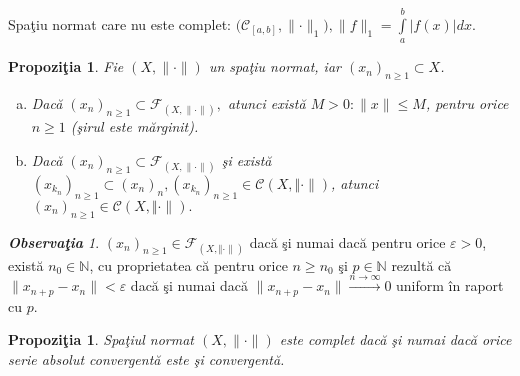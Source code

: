 \documentclass[ a4paper, 12pt]{report}
\newtheorem{prop}[theorem]{\bf Propozi\c tia }
\theoremstyle{definition}
\theoremstyle{remark}
\newtheorem{obs}{\bf Observa\c tia }[section]
\numberwithin{equation}{section}
\begin{document}
Spa\c tiu normat care nu este complet:
$\Big(\mathcal{C}_{[a,b]}, \lVert \cdot \rVert_{1} \Big), \lVert f \rVert_{1} = \int\limits_{a}^{b}\lvert f(x) \rvert dx$.
\begin{prop}\label{apa}
Fie $(X, \lVert \cdot \rVert)$ un spa\c tiu normat, iar $(x_n)_{n \geq 1} \subset X$.
\begin{enumerate}[(a)]
\item Dac\u a $(x_n)_{n \geq 1} \subset \mathcal{F}_{(X, \lVert \cdot \rVert)},$ atunci  exist\u a $M>0 : \lVert x \rVert \leq M$, pentru orice $n \geq 1$ (\c sirul este m\u arginit).
\item Dac\u a  $(x_n)_{n \geq 1} \subset \mathcal{F}_{(X, \lVert \cdot \rVert)}$ \c si  exist\u a $(x_{k_n})_{n \geq 1} \subset (x_n)_n,(x_{k_n})_{n \geq 1} \in \mathcal{C}{(X, \Vert \cdot \rVert)}$, atunci $(x_n)_{n \geq 1} \in \mathcal{C}{(X, \Vert \cdot \rVert)}.$ 
\end{enumerate}
\end{prop}
\begin{obs}
$(x_n)_{n \geq 1} \in \mathcal{F}_{(X, \Vert \cdot \rVert)}$ dac\u a \c si numai dac\u a pentru orice $\varepsilon>0$, exist\u a $n_0 \in \mathbb{N}$, cu proprietatea c\u a pentru orice $n \geq n_0$ \c si $p \in \mathbb{N}$ rezult\u a c\u a $\lVert x_{n+p} - x_n \rVert < \varepsilon$ dac\u a \c si numai dac\u a $\lVert x_{n+p} - x_n \rVert \stackrel{n \rightarrow \infty}{\longrightarrow} 0$ uniform \^in raport cu $p$.
\end{obs}
\begin{prop}
Spa\c tiul normat $(X,\lVert \cdot \rVert)$ este complet dac\u a \c si numai dac\u a orice serie absolut convergent\u a este \c si convergent\u a.
\end{prop}
\end{document}
